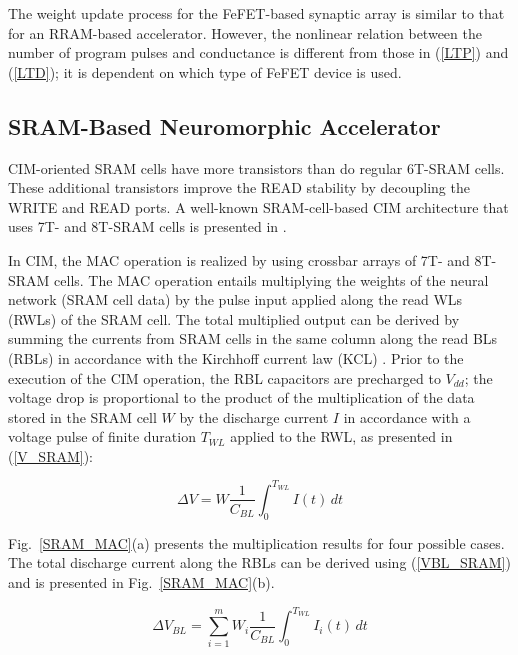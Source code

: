 \documentclass[journal]{IEEEtran}
\begin{document}
The weight update process for the FeFET-based synaptic array is similar to that for an RRAM-based accelerator. However, the nonlinear relation between the number of program pulses and conductance is different from those in (\ref{LTP}) and (\ref{LTD}); it is dependent on which type of FeFET device is used.

\subsection{SRAM-Based Neuromorphic Accelerator}
CIM-oriented SRAM cells have more transistors than do regular 6T-SRAM cells. These additional transistors improve the READ stability by decoupling the WRITE and READ ports. A well-known SRAM-cell-based CIM architecture that uses 7T- and 8T-SRAM cells is presented in \cite{CIMAT_SRAM}.



In CIM, the MAC operation is realized by using  crossbar arrays of 7T- and 8T-SRAM cells. The MAC operation entails multiplying the weights of the neural network (SRAM cell data) by the pulse input applied along the read WLs (RWLs) of the SRAM cell. The total multiplied output can be derived by summing the currents from SRAM cells in the same column along the read BLs (RBLs) in accordance with the Kirchhoff current law (KCL) \cite{KCL}. Prior to the execution of the CIM operation, the RBL capacitors are precharged to $V_{dd}$; the voltage drop is proportional to the product of the multiplication of the data stored in the SRAM cell $W$ by the discharge current $I$ in accordance with a voltage pulse of finite duration $T_{WL}$ applied to the RWL, as presented in (\ref{V_SRAM}): 


\begin{equation}
\Delta{V}=W\frac{1}{C_{BL}}\int_{0}^{T_{WL}}I(t) \,dt
\label{V_SRAM}
\end{equation}

Fig.~{\ref{SRAM_MAC}}(a) presents the multiplication results for four possible cases. The total discharge current along the RBLs can be derived using (\ref{VBL_SRAM})  and is presented in Fig.~{\ref{SRAM_MAC}}(b).

\begin{equation}
\Delta{V_{BL}}=\sum_{i=1}^{m}W_i\frac{1}{C_{BL}}\int_{0}^{T_{WL}}I_i(t) \,dt
\label{VBL_SRAM}
\end{equation}
\end{document}
